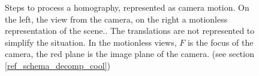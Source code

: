 \begin{figure}
		\caption{Steps to process a homography, represented as camera motion. On the left, the view from the camera, on the right a motionless representation of the scene.. The translations are not represented to simplify the situation. In the motionless views, $F$ is the focus of the camera, the red plane is the image plane of the camera. (see section \ref{ref_schema_decomp_cool})}
		\label{schema_decomp_cool}
		\label{SchemaEtapesDecompoGeometrique}
	\end{figure}
	\clearpage
